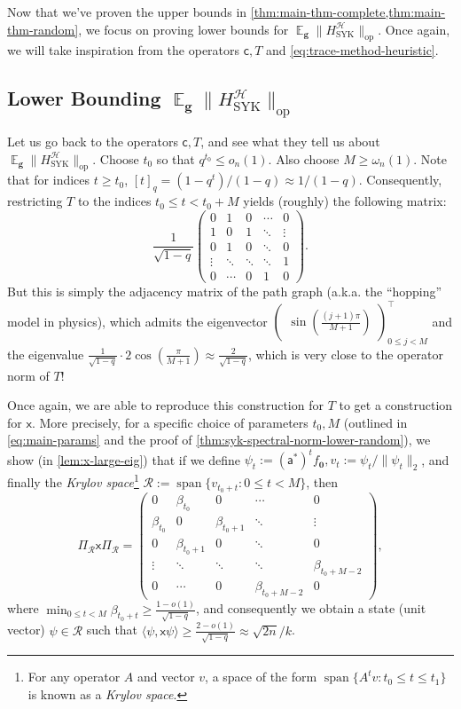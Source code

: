 \documentclass
[11pt,letterpaper]
{article}
\theoremstyle{definition}
\newcommand{\sfc}{\mathsf c}
\newcommand{\sfa}{\mathsf a}
\newcommand{\sfx}{\mathsf x}
\newcommand{\1}{\mathbf{1}}
\newcommand{\cH}{\mathcal H}
\newcommand{\spn}{\operatorname{span}}
\DeclareMathOperator*{\E}{\mathbb{E}}
\newcommand{\cR}{\mathcal R}
\renewcommand{\geq}{\geqslant}
\renewcommand{\leq}{\leqslant}
\begin{document}
Now that we've proven the upper bounds in \cref{thm:main-thm-complete,thm:main-thm-random}, we focus on proving lower bounds for $\E_{\bm g}\|H^\cH_{\operatorname{SYK}}\|_{\operatorname{op}}$. Once again, we will take inspiration from the operators $\sfc, T$ and \cref{eq:trace-method-heuristic}.

\subsection{\texorpdfstring{Lower Bounding $\E_{\bm g}\|H^\cH_{\operatorname{SYK}}\|_{\operatorname{op}}$}{Lower Bounding the SYK Operator Norm}} Let us go back to the operators $\sfc, T$, and see what they tell us about $\E_{\bm g}\|H^\cH_{\operatorname{SYK}}\|_{\operatorname{op}}$. Choose $t_0$ so that $q^{t_0}\leq o_n(1)$. Also choose $M\geq \omega_n(1)$. Note that for indices $t\geq t_0$, $[t]_q = (1 - q^t)/(1 - q)\approx 1/(1 - q)$. Consequently, restricting $T$ to the indices $t_0\leq t < t_0 + M$ yields (roughly) the following matrix:
\[\frac{1}{\sqrt{1 - q}}\begin{pmatrix}
0 & 1 & 0 & \cdots & 0 \\
1 & 0 & 1 & \ddots & \vdots \\
0 & 1 & 0 & \ddots & 0 \\
\vdots & \ddots & \ddots & \ddots & 1 \\
0 & \cdots & 0 & 1 & 0
\end{pmatrix}.\]
But this is simply the adjacency matrix of the path graph (a.k.a. the ``hopping'' model in physics), which admits the eigenvector $\begin{pmatrix}
    \sin\left(\frac{(j + 1)\pi}{M + 1}\right)
\end{pmatrix}_{0\leq j < M}^\top$ and the eigenvalue $\frac{1}{\sqrt{1 - q}}\cdot 2\cos(\frac{\pi}{M + 1})\approx \frac{2}{\sqrt{1 - q}}$, which is very close to the operator norm of $T$!

Once again, we are able to reproduce this construction for $T$ to get a construction for $\sfx$. More precisely, for a specific choice of parameters $t_0, M$ (outlined in \cref{eq:main-params} and the proof of \cref{thm:syk-spectral-norm-lower-random}), we show (in \cref{lem:x-large-eig}) that if we define $\psi_t:= (\sfa^*)^tf_{\bm 0}, v_t:= \psi_t/\|\psi_t\|_2$, and finally the \emph{Krylov space}\footnote{For any operator $A$ and vector $v$, a space of the form $\spn\{A^tv:t_0\leq t\leq t_1\}$ is known as a \emph{Krylov space}.} $\cR:=\spn\{v_{t_0 + t}:0\leq t < M\}$, then 
\[\Pi_\cR\sfx\Pi_\cR = \begin{pmatrix}
0 & \beta_{t_0} & 0 & \cdots & 0 \\
\beta_{t_0} & 0 & \beta_{t_0+1} & \ddots & \vdots \\
0 & \beta_{t_0+1} & 0 & \ddots & 0 \\
\vdots & \ddots & \ddots & \ddots & \beta_{t_0+M-2} \\
0 & \cdots & 0 & \beta_{t_0+M-2} & 0
\end{pmatrix},
\]
where $\min_{0\leq t < M}\beta_{t_0 + t}\geq \frac{1 - o(1)}{\sqrt{1 - q}}$, and consequently we obtain a state (unit vector) $\psi\in\cR$ such that $\langle\psi, \sfx\psi\rangle\geq \frac{2 - o(1)}{\sqrt{1 - q}}\approx \sqrt{2n}/k$.
\end{document}
